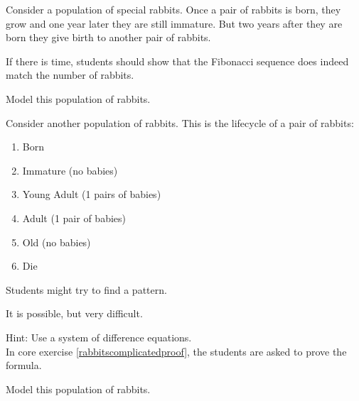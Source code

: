 \question
	Consider a population of special rabbits. Once a pair of rabbits is born, they grow and one year later they are still immature. But two years after they are born they give birth to another pair of rabbits.
	
\begin{annotation}
	\begin{goals}
		If there is time, students should show that the Fibonacci sequence does indeed match the number of rabbits.
	\end{goals}
\end{annotation}
	Model this population of rabbits.	

	


\bookonlynewpage


\question
	Consider another population of rabbits. This is the lifecycle of a pair of rabbits:
	\begin{enumerate}[start=0,label=(year \arabic*)]
		\item Born
		\item Immature (no babies)
		\item Young Adult (1 pairs of babies)
		\item Adult (1 pair of babies)
		\item Old (no babies)
		\item Die
	\end{enumerate}	
\begin{annotation}
	\begin{goals}
		Students might try to find a pattern. 
		
		It is possible, but very difficult.
		
		Hint: Use a system of difference equations. \\
		
		In core exercise \ref{rabbitscomplicatedproof}, the students are asked to prove the formula.
	\end{goals}
\end{annotation}
	
	Model this population of rabbits.
	
	




